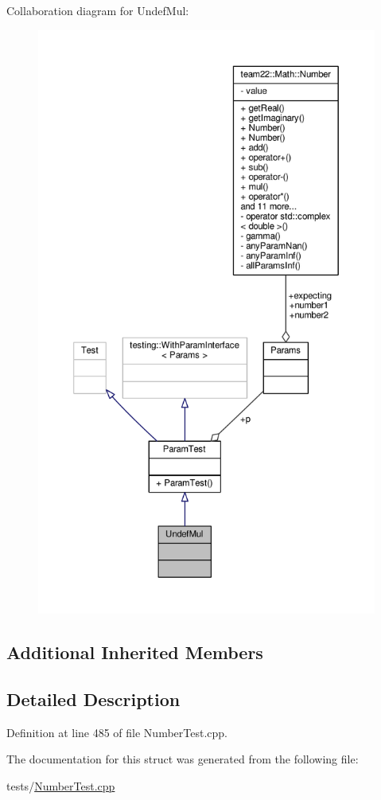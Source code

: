 Collaboration diagram for Undef\+Mul\+:
\nopagebreak
\begin{figure}[H]
\begin{center}
\leavevmode
\includegraphics[height=550pt]{struct_undef_mul__coll__graph}
\end{center}
\end{figure}
\subsection*{Additional Inherited Members}


\subsection{Detailed Description}


Definition at line 485 of file Number\+Test.\+cpp.



The documentation for this struct was generated from the following file\+:\begin{DoxyCompactItemize}
\item 
tests/\hyperlink{_number_test_8cpp}{Number\+Test.\+cpp}\end{DoxyCompactItemize}
